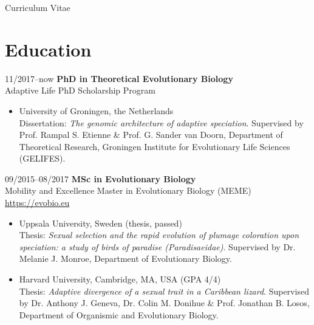 \documentclass[11pt,a4paper]{article}
\begin{document}
\begin{cv}{Curriculum Vitae}
\begin{cvlist}{}
        \end{cvlist}
		
		\section{Education}
		
		\begin{cvlist}{}
			
			\item[11/2017--now] 
			\textbf{PhD in Theoretical Evolutionary Biology}\\
            Adaptive Life PhD Scholarship Program

            \begin{itemize}
                \item University of Groningen, the Netherlands\\
                Dissertation: \textit{The genomic architecture of adaptive speciation}. Supervised by Prof. Rampal S. Etienne \& Prof. G. Sander van Doorn, Department of Theoretical Research, Groningen Institute for Evolutionary Life Sciences (GELIFES).
            \end{itemize}

            \item[09/2015--08/2017] 
			\textbf{MSc in Evolutionary Biology}\\
			Mobility and Excellence Master in Evolutionary Biology (MEME)\\
            \url{https://evobio.eu}

            \begin{itemize}
            
                \item Uppsala University, Sweden (thesis, passed)\\
                Thesis: \textit{Sexual selection and the rapid evolution of plumage coloration upon speciation: a study of birds of paradise (Paradisaeidae)}. Supervised by Dr. Melanie J. Monroe, Department of Evolutionary Biology.
                
                \item Harvard University, Cambridge, MA, USA (GPA 4/4)\\
                Thesis: \textit{Adaptive divergence of a sexual trait in a Caribbean lizard}. Supervised by Dr. Anthony J. Geneva, Dr. Colin M. Donihue \& Prof. Jonathan B. Losos, Department of Organismic and Evolutionary Biology.
                

\end{itemize}
\end{cvlist}
\end{cv}
\end{document}
